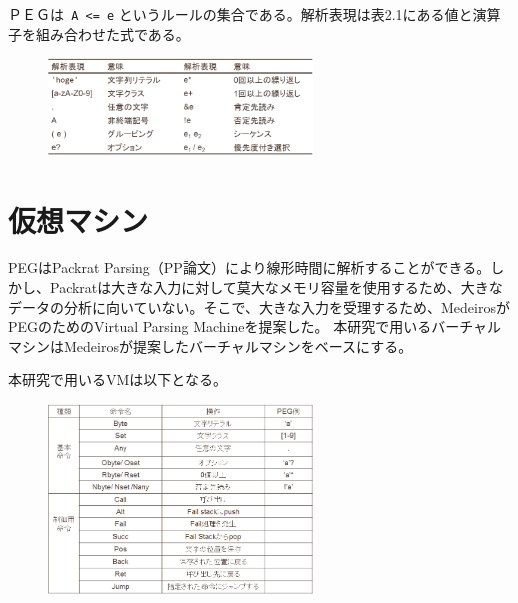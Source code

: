 \documentclass[paper]{ieicej}
\begin{document}
ＰＥＧは\texttt{ A <= e} というルールの集合である。解析表現は表2.1にある値と演算子を組み合わせた式である。\\



\begin{figure}[h]
    \begin{center}
        \includegraphics[width=70mm]{./fig/PEG}
    \end{center}
\end{figure}


\section{仮想マシン}

PEGはPackrat Parsing（PP論文）により線形時間に解析することができる。しかし、Packratは大きな入力に対して莫大なメモリ容量を使用するため、大きなデータの分析に向いていない。そこで、大きな入力を受理するため、MedeirosがPEGのためのVirtual Parsing Machineを提案した。
本研究で用いるバーチャルマシンはMedeirosが提案したバーチャルマシンをベースにする。

本研究で用いるVMは以下となる。

\begin{figure}[h]
    \begin{center}
        \includegraphics[width=70mm]{./fig/VM}
    \end{center}
\end{figure}

\end{document}
